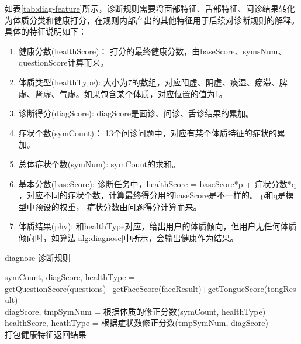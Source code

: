 如表\ref{tab:diag-feature}所示，诊断规则需要将面部特征、舌部特征、问诊结果转化为体质分类和健康打分，在规则内部产出的其他特征用于后续对诊断规则的解释。
具体的特征说明如下：
\begin{enumerate}
    \item 健康分数(healthScore)： 打分的最终健康分数，由baseScore、symsNum、questionScore计算而来。

    \item 体质类型(healthType): 大小为7的数组，对应阳虚、阴虚、痰湿、瘀滞、脾虚、肾虚、气虚。如果包含某个体质，对应位置的值为1。

    \item 诊断得分(diagScore): diagScore是面诊、问诊、舌诊结果的累加。

    \item 症状个数(symCount)： 13个问诊问题中，对应有某个体质特征的症状的累加。

    \item 总体症状个数(symNum): symCount的求和。

    \item 基本分数(baseScore): 诊断任务中，healthScore = baseScore*p + 症状分数*q ，对应不同的症状个数，计算最终得分用的baseScore是不一样的。
p和q是模型中预设的权重， 症状分数由问题得分计算而来。

    \item 体质结果(phy): 和healthType对应，给出用户的体质倾向，但用户无任何体质倾向时，如算法\ref{alg:diagnose}中所示，会输出健康作为结果。
\end{enumerate}


\begin{algorithm}[htbp]
\caption{diagnose 诊断规则\cite{张红凯2018基于舌}}%
\label{alg:diagnose}
\LinesNumbered %
symCount, diagScore, healthType = getQuestionScore(questions)+getFaceScore(faceResult)+getTongueScore(tongResult)\\

diagScore, tmpSymNum = 根据体质的修正分数(symCount, healthType) \\
healthScore, heathType = 根据症状数修正分数(tmpSymNum, diagScore)\\

打包健康特征返回结果\\
\end{algorithm}

